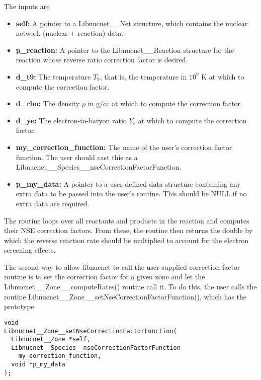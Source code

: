 \documentclass{article}    %
\begin{document}
The inputs are
\begin{itemize}

\item {\bf self:} A pointer to a Libnucnet\_\_Net structure, which contains
the nuclear network (nuclear + reaction) data.

\item {\bf p\_reaction:}  A pointer to the Libnucnet\_\_Reaction structure
for the reaction whose reverse ratio correction factor is desired.

\item {\bf d\_t9:}  The temperature $T_9$, that is, the temperature
in $10^9$ K at which to compute the correction factor.

\item {\bf d\_rho:}  The density $\rho$ in g/cc at which to compute
the correction factor.

\item {\bf d\_ye:}  The electron-to-baryon ratio $Y_e$ at which to compute
the correction factor.

\item {\bf my\_correction\_function:}  The
name of the user's correction factor function.  The user should cast this
as a Libnucnet\_\_Species\_\_nseCorrectionFactorFunction.

\item {\bf p\_my\_data:}  A pointer to a user-defined data structure
containing any extra data to be passed into the user's routine.  This should
be NULL if no extra data are required.

\end{itemize}

The routine loops over all reactants and products in the reaction and
computes their NSE correction factors.  From these, the routine then
returns the double by which the reverse reaction rate should be multiplied
to account for the electron screening effects.

The second way to allow libnucnet to call the user-supplied correction
factor routine is to set the correction factor for a given zone and
let the\\
Libnucnet\_\_Zone\_\_computeRates() routine call it.
To do this, the user calls the routine
Libnucnet\_\_Zone\_\_setNseCorrectionFactorFunction(),
which has the prototype

\begin{verbatim}
void
Libnucnet__Zone__setNseCorrectionFactorFunction(
  Libnucnet__Zone *self,
  Libnucnet__Species__nseCorrectionFactorFunction
    my_correction_function,
  void *p_my_data
);
\end{verbatim}
\end{document}
